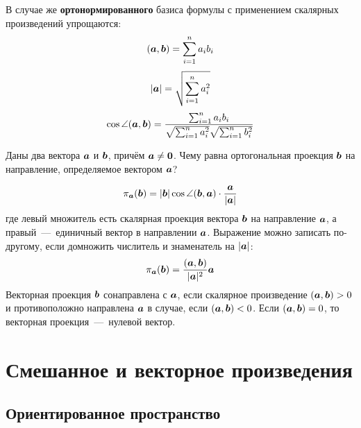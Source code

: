 \documentclass[a4paper,12pt]{article}
\begin{document}
  
  
  
  В случае же \textbf{ортонормированного} базиса формулы с применением скалярных произведений упрощаются:
  \begin{equation}\label{eq:scalar-product-simplified}
    (\boldsymbol a, \boldsymbol b) = \sum_{i=1}^n a_i b_i
  \end{equation}
  \[
    |\boldsymbol a| = \sqrt{\sum_{i=1}^n a_i^2}
  \]
  \[
    \cos\angle(\boldsymbol a, \boldsymbol b) = \frac{\sum_{i=1}^n a_i b_i}{\sqrt{\sum_{i=1}^n a_i^2} \sqrt{\sum_{i=1}^n b_i^2}}
  \]
  
  
  \begin{problem}[2.24]
    Даны два вектора $\boldsymbol a$ и $\boldsymbol b$, причём $\bds a \hm{\not=} \bds 0$.
    Чему равна ортогональная проекция $\boldsymbol b$ на направление, определяемое вектором $\boldsymbol a$?
  \end{problem}
  
  \begin{solution}
    \[
      \pi_{\boldsymbol a}(\boldsymbol b) = |\boldsymbol b| \cos\angle(\boldsymbol b, \boldsymbol a) \cdot \frac{\boldsymbol a}{|\boldsymbol a|}
    \]
    где левый множитель есть скалярная проекция вектора $\boldsymbol b$ на направление $\boldsymbol a$,
    а правый~---~единичный вектор в направлении $\boldsymbol a$.
    Выражение можно записать по-другому, если домножить числитель и знаменатель на $|\boldsymbol a|$:
    \[
      \pi_{\boldsymbol a}(\boldsymbol b) = \frac{(\boldsymbol a, \boldsymbol b)}{|\boldsymbol a|^2} \boldsymbol a
    \]
    Векторная проекция $\boldsymbol b$ сонаправлена с $\boldsymbol a$, если скалярное произведение $(\bds a, \bds b) \hm> 0$ и противоположно направлена $\boldsymbol a$ в случае, если $(\bds a, \bds b) \hm< 0$.
    Если $(\bds a, \bds b) \hm= 0$, то векторная проекция~---~нулевой вектор.
  \end{solution}
  
  
  
  

  \section{Смешанное и векторное произведения}
  
  \subsection{Ориентированное пространство}
  
\end{document}
